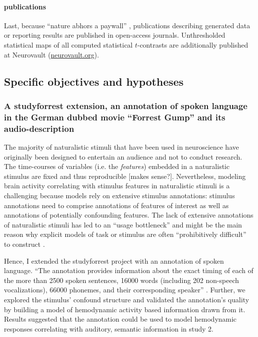 \paragraph{publications}
Last, because ``nature abhors a paywall'' \citep{dupre2020nature}, publications
describing generated data or reporting results are published in open-access
journals.
Unthresholded statistical maps of all computed statistical $t$-contrasts are
additionally published at Neurovault
(\href{https://neurovault.org/}{neurovault.org}).


\subsection{Specific objectives and hypotheses}


\subsubsection{A studyforrest extension, an annotation of spoken language in the
German dubbed movie ``Forrest Gump'' and its audio-description}

%
The majority of naturalistic stimuli that have been used in neuroscience have
originally been designed to entertain an audience and not to conduct research.
%
The time-courses of variables (i.e. the \textit{features}) embedded in a
naturalistic stimulus are fixed and thus reproducible [makes sense?].
%
Nevertheless, modeling brain activity correlating with stimulus features in
naturalistic stimuli is a challenging \citep{saarimaki2021naturalistic,
simony2020analysis} because models rely on  extensive stimulus annotations:
%
stimulus annotations need to comprise annotations of features of interest as
well as annotations of potentially confounding features.
%
The lack of extensive annotations of naturalistic stimuli has led to an ``usage
bottleneck'' \citep{aliko2020naturalistic} and might be the main reason why
explicit models of task or stimulus are often ``prohibitively difficult'' to
construct \citep{nastase2019measuring}.

Hence, I extended the studyforrest project with an annotation of spoken
language.
``The annotation provides information about the exact timing of each of the more
than 2500 spoken sentences, 16000 words (including 202 non-speech
vocalizations), 66000 phonemes, and their corresponding speaker''
\citep{haeusler2021speechanno}.
%
Further, we explored the stimulus' confound structure and validated the
annotation's quality by building a model of hemodynamic activity based
information drawn from it.
%
Results suggested that the annotation could be used to model hemodynamic
responses correlating with auditory, semantic information in study 2.



